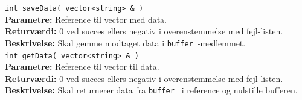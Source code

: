 \verb+int saveData( vector<string> & )+ \\
\textbf{Parametre:} Reference til vector med data. \\
\textbf{Returværdi:} 0 ved succes ellers negativ i overenstemmelse med fejl-listen. \\
\textbf{Beskrivelse:} Skal gemme modtaget data i \verb+buffer_+-medlemmet.\\

\verb+int getData( vector<string> & )+ \\
\textbf{Parametre:} Reference til vector til data. \\
\textbf{Returværdi:} 0 ved succes ellers negativ i overenstemmelse med fejl-listen. \\
\textbf{Beskrivelse:} Skal returnerer data fra \verb+buffer_+ i reference og nulstille bufferen.\\